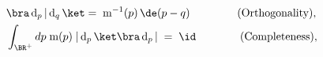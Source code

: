 \begin{equation} \label{orthcomp} \begin{aligned}
{} & \bra\,{\rm d}_p\,|\,{\rm d}_q\,\ket = \;{\rm m}^{-1}(p)\,\de(p-q)
\qquad\qquad\;\text{\rm (Orthogonality)}, \\
{}& 
\int_{\BR^+}dp \;{\rm m}(p) \;|\,{\rm d}_p\,\ket \bra\,{\rm d}_p\,|
\;= \;\id \qquad \qquad\text{\rm (Completeness)},
\end{aligned}\end{equation} 

